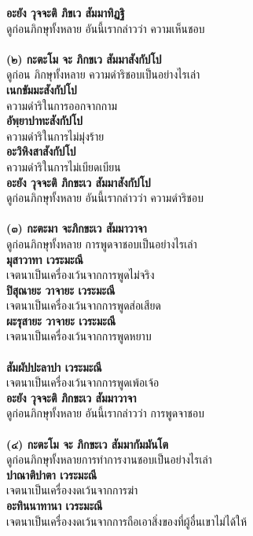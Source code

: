 \documentclass[12pt]{article}
\begin{document}
\textbf{อะยัง วุจจะติ ภิขเว สัมมาทิฏฐิ}\\
\indent ดูก่อนภิกษุทั้งหลาย อันนี้เรากล่าวว่า ความเห็นชอบ\\
\\
\textbf{(๒) กะตะโม จะ  ภิกขเว สัมมาสังกัปโป}\\
\indent ดูก่อน ภิกษุทั้งหลาย ความดำริชอบเป็นอย่างไรเล่า\\
\textbf{เนกขัมมะสังกัปโป}\\
\indent ความดำริในการออกจากกาม\\
\textbf{อัพฺยาปาทะสังกัปโป}\\
\indent ความดำริในการไม่มุ่งร้าย\\
\textbf{อะวิหิงสาสังกัปโป}\\
\indent ความดำริในการไม่เบียดเบียน\\
\textbf{อะยัง วุจจะติ ภิกขะเว สัมมาสังกัปโป}\\
\indent ดูก่อนภิกษุทั้งหลาย อันนี้เรากล่าวว่า ความดำริชอบ\\
\\
\textbf{(๓) กะตะมา จะภิกขะเว สัมมาวาจา}\\
\indent ดูก่อนภิกษุทั้งหลาย การพูดจาชอบเป็นอย่างไรเล่า\\
\textbf{มุสาวาทา เวระมะณี}\\
\indent เจตนาเป็นเครื่องเว้นจากการพูดไม่จริง\\
\textbf{ปิสุณายะ วาจายะ เวระมะณี}\\
\indent เจตนาเป็นเครื่องเว้นจากการพูดส่อเสียด\\
\textbf{ผะรุสายะ วาจายะ เวระมะณี}\\
\indent เจตนาเป็นเครื่องเว้นจากการพูดหยาบ\\
\\
\textbf{สัมผัปปะลาปา เวระมะณี}\\
\indent เจตนาเป็นเครื่องเว้นจากการพูดเพ้อเจ้อ\\
\textbf{อะยัง วุจจะติ ภิกขะเว สัมมาวาจา}\\
\indent ดูก่อนภิกษุทั้งหลาย อันนี้เรากล่าวว่า การพูดจาชอบ\\
\\
\textbf{(๔) กะตะโม จะ ภิกขะเว สัมมากัมมันโต}\\
\indent ดูก่อนภิกษุทั้งหลายการทำการงานชอบเป็นอย่างไรเล่า\\
\textbf{ปาณาติปาตา เวระมะณี}\\
\indent เจตนาเป็นเครื่องงดเว้นจากการฆ่า\\
\textbf{อะทินนาทานา เวระมะณี}\\
\indent เจตนาเป็นเครื่องงดเว้นจากการถือเอาสิ่งของที่ผู้อื่นเขาไม่ได้ให้\\
\end{document}

